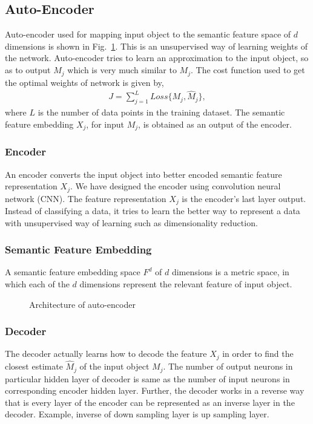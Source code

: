 \documentclass[11pt, conference, english]{IEEEtran}
\theoremstyle{plain}
\theoremstyle{definition}
\theoremstyle{remark}
\newcommand{\eq}[1]{\begin{align*}#1\end{align*}}
\begin{document}
	\subsection{Auto-Encoder}
	Auto-encoder used for mapping input object to the semantic feature space of $d$ dimensions is shown in Fig.~\ref{Fig:SystemModel2}. This is an unsupervised way of learning weights of the network. Auto-encoder tries to learn an approximation to the input object, so as to output $\hat{M}_j$ which is very much similar to $M_j$.  The cost function used to get the optimal weights of network is given by,  \eq{J=\sum\limits_{j=1}^{L} Loss\{M_j,\hat{M}_j\},} 
	where $L$ is the number of data points in the training dataset. The semantic feature embedding $X_j$, for input $M_j$, is obtained as an output of the encoder.
	
	\subsubsection{Encoder}
	An encoder converts the input object into better encoded semantic feature representation $X_j$.
	We have designed the encoder using convolution neural network (CNN).
	The feature representation $X_j$ is the encoder's last layer output. Instead of classifying a data, it tries to learn the better way to represent a data with unsupervised way of learning such as dimensionality reduction.
	
	\subsubsection{Semantic Feature Embedding}
	A semantic feature embedding space $F^d$ of $d$ dimensions is a metric space, in which each of the $d$ dimensions represent the relevant feature of input object.

	
	
	\begin{figure}[h!]
		\centering
		\scalebox{.5}{}
		\caption{Architecture of auto-encoder}
		\label{Fig:SystemModel2}
	\end{figure}
		\subsubsection{Decoder}
		The decoder actually learns how to decode the  feature $X_j$ in order to find the closest estimate $\hat{M}_j$ of the input object $M_j$.
		The number of output neurons in particular hidden layer of decoder is same as the number of input neurons in corresponding encoder hidden layer. Further, the decoder works in a reverse way that is every layer of the encoder can be represented as an inverse layer in the decoder.
		Example, inverse of down sampling layer is up sampling layer. 
\end{document}
